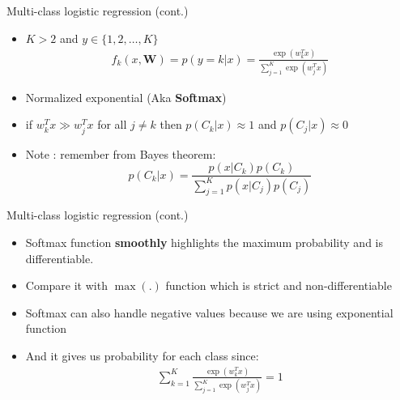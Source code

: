 \documentclass[serif, aspectratio=169]{beamer}
\begin{document}
\begin{frame}{Multi-class logistic regression (cont.)}
    \begin{itemize}
        \item $K > 2$ and $y \in \{1,2,\dots,K\}$
        \begin{align*}
            f_k(x, \mathbf{W}) = p(y=k|x) = \frac{\exp{(w^T_kx)}}{\sum_{j=1}^{K}\exp{(w_j^Tx)}}
        \end{align*}
        \item Normalized exponential (Aka \textbf{Softmax})
          
            \item if $w_k^Tx \gg w_j^Tx$ for all $j \neq k$ then $p(C_k|x) \approx 1$ and $p(C_j|x) \approx 0$
            \item Note : remember from Bayes theorem:
                \[
                p(C_k|x) = \frac{p(x|C_k)p(C_k)}
            {\sum_{j=1}^{K}p(x|C_j)p(C_j)}
                \]
          
    \end{itemize}
\end{frame}
\begin{frame}{Multi-class logistic regression (cont.)}
    \begin{itemize}
        \item Softmax function \textbf{smoothly} highlights the maximum probability and is differentiable.
        \item Compare it with $\max (.)$ function which is strict and non-differentiable
        \item Softmax can also handle negative values because we are using exponential function
        \item And it gives us probability for each class since:
            \begin{align*}
                \displaystyle \sum _{k=1}^{K} \frac{\exp (w_k^Tx)}{\sum _{j=1}^{K} \exp (w_j^Tx) } = 1
            \end{align*}
    \end{itemize}
\end{frame}
\end{document}

